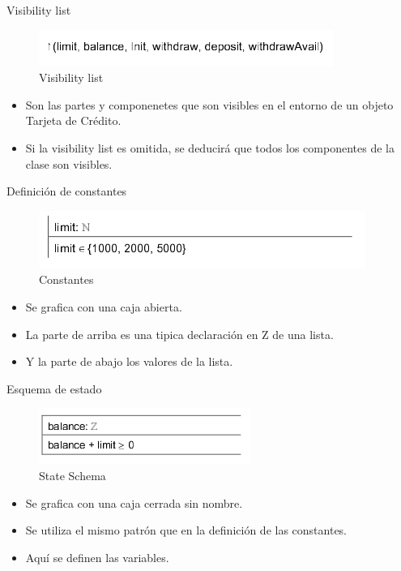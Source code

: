 \documentclass{beamer}
\begin{document}
\begin{frame}{Visibility list}
  \begin{figure}
      \centering
      \includegraphics[scale=0.5]{Z2.png}
      \caption{Visibility list}
      \label{Visibility List}
  \end{figure}
  \begin{itemize}
      \item Son las partes y componenetes que son visibles en el entorno de un objeto Tarjeta de Crédito.
      \item Si la visibility list es omitida, se deducirá que todos los componentes de la clase son visibles.
  \end{itemize}
\end{frame}

\begin{frame}{Definición de constantes}
  \begin{figure}
      \centering
      \includegraphics[scale=0.5]{Z3.png}
      \caption{Constantes}
      \label{Constantes}
  \end{figure}
  \begin{itemize}
   \item Se grafica con una caja abierta.
   \item La parte de arriba es una tipica declaración en Z de una lista.
   \item Y la parte de abajo los valores de la lista.
  \end{itemize}
\end{frame}

\begin{frame}{Esquema de estado}
  \begin{figure}
      \centering
      \includegraphics[scale=0.5]{Z4.png}
      \caption{State Schema}
      \label{Esquema de estado}
  \end{figure}
  \begin{itemize}
   \item Se grafica con una caja cerrada sin nombre.
   \item Se utiliza el mismo patrón que en la definición de las constantes.
   \item Aquí se definen las variables.
  \end{itemize}
\end{frame}
\end{document}
